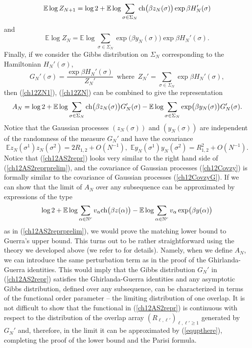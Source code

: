 \documentclass[12pt]{article}
\newcommand{\ch}{{\mbox{\rm ch}}}
\newcommand{\e}{\mathbb{E}}
\newcommand{\Natural}{\mathbb{N}}
\theoremstyle{nonumberplain}
\begin{document}
\begin{equation}
\e\log Z_{N+1} 
= \log 2 + 
\e \log \sum_{\sigma\in\Sigma_N} \ch \bigl(\beta z_N(\sigma) \bigr) \exp \beta H_{N}'(\sigma)
\label{ch12ZN1}
\end{equation}
and
\begin{equation}
\e\log Z_{N} 
=
\e \log \sum_{\sigma\in\Sigma_N} \exp\bigl(\beta y_N(\sigma) \bigr) \exp \beta H_{N}'(\sigma).
\label{ch12ZN}
\end{equation}
Finally, if we consider the Gibbs distribution on $\Sigma_N$ corresponding to the Hamiltonian $H_N'(\sigma)$,
\begin{equation}
G_N'(\sigma) = \frac{\exp \beta H_N'(\sigma)}{Z_N'}
\,\mbox{ where }\,
Z_N' = \sum_{\sigma\in\Sigma_{N}} \exp \beta H_N'(\sigma),
\label{ch12MeasureGNprime}
\end{equation}
then (\ref{ch12ZN1}), (\ref{ch12ZN}) can be combined to give the representation
\begin{equation}
A_N= \log 2 +
\e \log \sum_{\sigma\in\Sigma_{N}} \ch\bigl(\beta z_N(\sigma)\bigr) G_N'(\sigma)
-
\e \log \sum_{\sigma\in\Sigma_{N}} \exp\bigl(\beta y_N(\sigma)\bigr) G_N'(\sigma).
\label{ch12AS2repr}
\end{equation}
Notice that the Gaussian processes $(z_N(\sigma))$ and $(y_N(\sigma))$ are independent of the randomness of the measure $G_N'$ and have the covariance
\begin{equation}
\e z_N(\sigma^1) z_N(\sigma^2) = 2 R_{1,2} + O(N^{-1}),\,\,
\e y_N(\sigma^1) y_N(\sigma^2) = R_{1,2}^2 + O(N^{-1}).
\label{ch12Covzy}
\end{equation}
Notice that (\ref{ch12AS2repr}) looks very similar to the right hand side of (\ref{ch12AS2reprprelim}), and the covariance of Gaussian processes (\ref{ch12Covzy}) is formally similar to the covariance of Gaussian processes (\ref{ch12CovzyG}). If we can show that the limit of $A_N$ over any subsequence can be approximated by expressions of the type 
\begin{equation}
\log 2 + \e\log \sum_{\alpha\in\Natural^r} v_{\alpha} \ch\bigl(\beta z(\alpha) \bigr)
-
\e\log \sum_{\alpha\in\Natural^r} v_{\alpha} \exp \bigl(\beta y(\alpha) \bigr)
\label{equpthere}
\end{equation}
as in (\ref{ch12AS2reprprelim}), we would prove the matching lower bound to Guerra's upper bound. This turns out to be rather straightforward using the theory we developed above (we refer to \cite{SKmodel} for details). Namely, when we define $A_N$, we can introduce the same perturbation term as in the proof of the Ghirlanda-Guerra identities. This would imply that the Gibbs distribution $G_N'$ in (\ref{ch12AS2repr}) satisfies the Ghirlanda-Guerra identities and any asymptotic Gibbs distribution, defined over any subsequence, can be characterized in terms of the functional order parameter -- the limiting distribution of one overlap. It is not difficult to show that the functional in (\ref{ch12AS2repr}) is continuous with respect to the distribution of the overlap array $(R_{\ell,\ell'})_{\ell,\ell'\geq 1}$ generated by $G_N'$ and, therefore, in the limit it can be approximated by (\ref{equpthere}), completing the proof of the lower bound and the Parisi formula.
\end{document}
